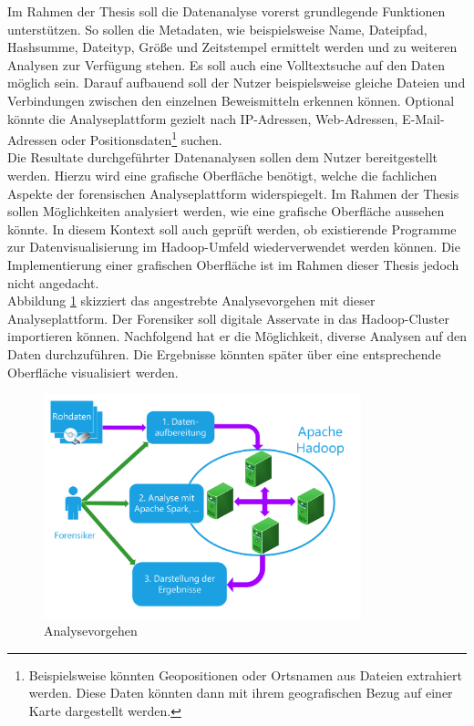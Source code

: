 \noindent
Im Rahmen der Thesis soll die Datenanalyse vorerst grundlegende Funktionen unterstützen.
So sollen die Metadaten, wie beispielsweise Name, Dateipfad, Hashsumme, Dateityp, Größe und Zeitstempel ermittelt werden und zu weiteren Analysen zur Verfügung stehen.
Es soll auch eine Volltextsuche auf den Daten möglich sein. Darauf aufbauend soll der Nutzer beispielsweise gleiche Dateien und Verbindungen zwischen den einzelnen Beweismitteln erkennen können.
Optional könnte die Analyseplattform gezielt nach IP-Adressen, Web-Adressen, E-Mail-Adressen oder Positionsdaten\footnote{Beispielsweise könnten Geopositionen oder Ortsnamen aus Dateien extrahiert werden. Diese Daten könnten dann mit ihrem geografischen Bezug auf einer Karte dargestellt werden.} suchen.\\

\noindent
Die Resultate durchgeführter Datenanalysen sollen dem Nutzer bereitgestellt werden. Hierzu
wird eine grafische Oberfläche benötigt, welche die fachlichen Aspekte der forensischen Analyseplattform widerspiegelt. Im Rahmen der Thesis sollen Möglichkeiten analysiert werden, wie eine grafische Oberfläche aussehen könnte. In diesem Kontext soll auch geprüft werden, ob existierende Programme zur Datenvisualisierung im Hadoop-Umfeld wiederverwendet werden können. Die Implementierung einer grafischen Oberfläche ist im Rahmen dieser Thesis jedoch nicht angedacht.\\

\noindent
Abbildung \ref{fig:foam_analysis_approach} skizziert das angestrebte Analysevorgehen mit dieser Analyseplattform. Der Forensiker soll digitale Asservate in das Hadoop-Cluster importieren können. Nachfolgend hat er die Möglichkeit, diverse Analysen auf den Daten durchzuführen. Die Ergebnisse könnten später über eine entsprechende Oberfläche visualisiert werden.\\

\begin{figure}[ht]
  \centering
  \includegraphics[width=0.82\textwidth]{./resource/Hadoop-Struktur.pdf}
  \caption{Analysevorgehen}
  \label{fig:foam_analysis_approach}
\end{figure}


